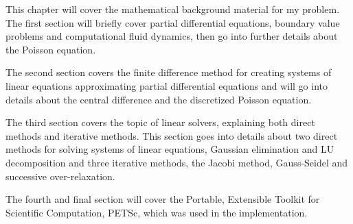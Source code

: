 This chapter will cover the mathematical background material for my problem. The
first section will briefly cover partial differential equations, boundary value
problems and computational fluid dynamics, then go into further details about
the Poisson equation.

The second section covers the finite difference method for creating systems of
linear equations approximating partial differential equations and will go into
details about the central difference and the discretized Poisson equation.

The third section covers the topic of linear solvers, explaining both direct
methods and iterative methods. This section goes into details about two direct
methods for solving systems of linear equations, Gaussian elimination and LU
decomposition and three iterative methods, the Jacobi method, Gauss-Seidel and
successive over-relaxation.

The fourth and final section will cover the Portable, Extensible Toolkit for
Scientific Computation, PETSc, which was used in the implementation.
